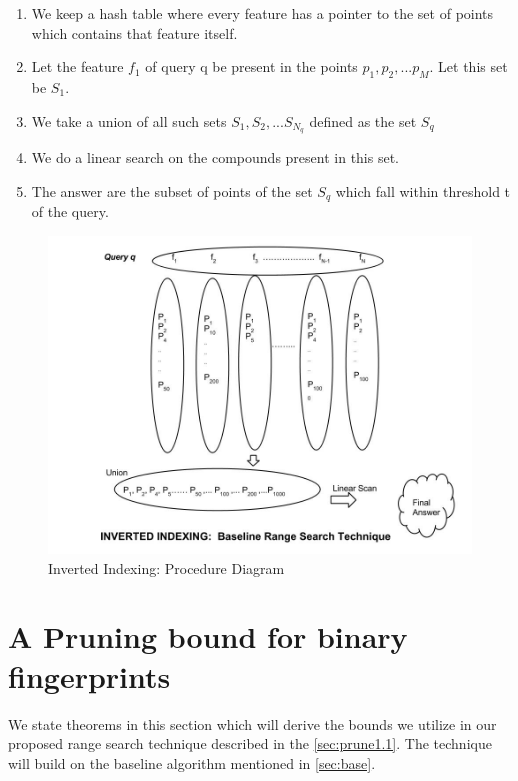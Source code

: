 \begin{enumerate}
	\item We keep a hash table where every feature has a pointer to the set of points which contains that feature itself.
	\item Let the feature $f_1$ of query q be present in the points $p_1,p_2,...p_M$. Let this set be $S_1$.
	\item We take a union of all such sets $S_1, S_2,...S_{N_q}$ defined as the set $S_q$
	\item We do a linear search on the compounds present in this set.
	\item The answer are the subset of points of the set $S_q$ which fall within threshold t of the query.	 
\end{enumerate}


\begin{figure}[ht]	
\centering
\includegraphics[width=1 \columnwidth]{img/image0c.jpg}
\caption{Inverted Indexing: Procedure Diagram}
\label{fig: invert}
\end{figure}




\section{A Pruning bound for binary fingerprints}
\label{sec:prune1}
We state theorems in this section which will derive the bounds we utilize in our proposed range search technique described in the \autoref{sec:prune1.1}. The technique will build on the baseline algorithm mentioned in \autoref{sec:base}.

